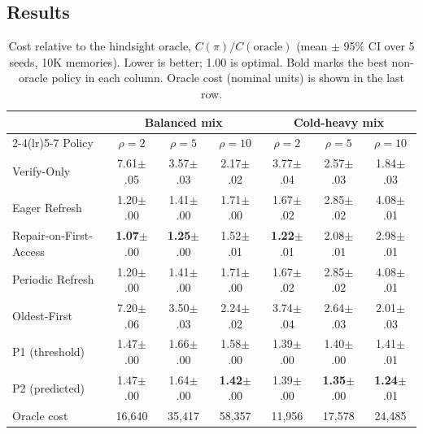 \documentclass{article}
\begin{document}
\subsection{Results}

\begin{table}[t]
\centering
\small
\caption{Cost relative to the hindsight oracle, $C(\pi)/C(\mathrm{oracle})$
(mean $\pm$ 95\% CI over 5 seeds, 10K memories). Lower is better; 1.00 is
optimal. Bold marks the best non-oracle policy in each column. Oracle cost
(nominal units) is shown in the last row.}
\label{tab:main}
\begin{tabular}{@{}lcccccc@{}}
\toprule
 & \multicolumn{3}{c}{Balanced mix} & \multicolumn{3}{c}{Cold-heavy mix} \\
\cmidrule(lr){2-4}\cmidrule(lr){5-7}
Policy & $\rho=2$ & $\rho=5$ & $\rho=10$ & $\rho=2$ & $\rho=5$ & $\rho=10$ \\
\midrule
Verify-Only            & 7.61{\scriptsize$\pm$.05} & 3.57{\scriptsize$\pm$.03} & 2.17{\scriptsize$\pm$.02} & 3.77{\scriptsize$\pm$.04} & 2.57{\scriptsize$\pm$.03} & 1.84{\scriptsize$\pm$.03} \\
Eager Refresh          & 1.20{\scriptsize$\pm$.00} & 1.41{\scriptsize$\pm$.00} & 1.71{\scriptsize$\pm$.00} & 1.67{\scriptsize$\pm$.02} & 2.85{\scriptsize$\pm$.02} & 4.08{\scriptsize$\pm$.01} \\
Repair-on-First-Access & \textbf{1.07}{\scriptsize$\pm$.00} & \textbf{1.25}{\scriptsize$\pm$.00} & 1.52{\scriptsize$\pm$.01} & \textbf{1.22}{\scriptsize$\pm$.01} & 2.08{\scriptsize$\pm$.01} & 2.98{\scriptsize$\pm$.01} \\
Periodic Refresh       & 1.20{\scriptsize$\pm$.00} & 1.41{\scriptsize$\pm$.00} & 1.71{\scriptsize$\pm$.00} & 1.67{\scriptsize$\pm$.02} & 2.85{\scriptsize$\pm$.02} & 4.08{\scriptsize$\pm$.01} \\
Oldest-First           & 7.20{\scriptsize$\pm$.06} & 3.50{\scriptsize$\pm$.03} & 2.24{\scriptsize$\pm$.02} & 3.74{\scriptsize$\pm$.04} & 2.64{\scriptsize$\pm$.03} & 2.01{\scriptsize$\pm$.03} \\
P1 (threshold)         & 1.47{\scriptsize$\pm$.00} & 1.66{\scriptsize$\pm$.00} & 1.58{\scriptsize$\pm$.00} & 1.39{\scriptsize$\pm$.00} & 1.40{\scriptsize$\pm$.00} & 1.41{\scriptsize$\pm$.01} \\
P2 (predicted)         & 1.47{\scriptsize$\pm$.00} & 1.64{\scriptsize$\pm$.00} & \textbf{1.42}{\scriptsize$\pm$.00} & 1.39{\scriptsize$\pm$.00} & \textbf{1.35}{\scriptsize$\pm$.00} & \textbf{1.24}{\scriptsize$\pm$.01} \\
\midrule
Oracle cost            & 16,640 & 35,417 & 58,357 & 11,956 & 17,578 & 24,485 \\
\bottomrule
\end{tabular}
\end{table}
\end{document}
